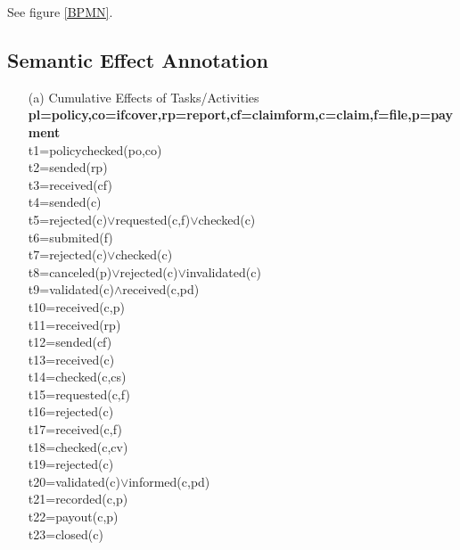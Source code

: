 \documentclass[runningheads]{llncs}
\begin{document}
See figure \ref{BPMN}.



\subsection{Semantic Effect Annotation}

\begin{itemize}
\item[(a)]{Cumulative Effects of Tasks/Activities} \\
\textbf{pl=policy,co=ifcover,rp=report,cf=claimform,c=claim,f=file,p=payment}\\
t1=policychecked(po,co) \\
t2=sended(rp)\\
t3=received(cf)\\
t4=sended(c)\\
t5=rejected(c)$\vee$requested(c,f)$\vee$checked(c)\\
t6=submited(f)\\
t7=rejected(c)$\vee$checked(c)\\
t8=canceled(p)$\vee$rejected(c)$\vee$invalidated(c)\\
t9=validated(c)$\wedge$received(c,pd)\\                
t10=received(c,p)\\
t11=received(rp)\\
t12=sended(cf)\\
t13=received(c)\\
t14=checked(c,cs)\\
t15=requested(c,f)\\
t16=rejected(c)\\
t17=received(c,f)\\
t18=checked(c,cv)\\
t19=rejected(c)\\
t20=validated(c)$\vee$informed(c,pd)\\
t21=recorded(c,p)\\
t22=payout(c,p)\\
t23=closed(c)\\


\end{itemize}
\end{document}
